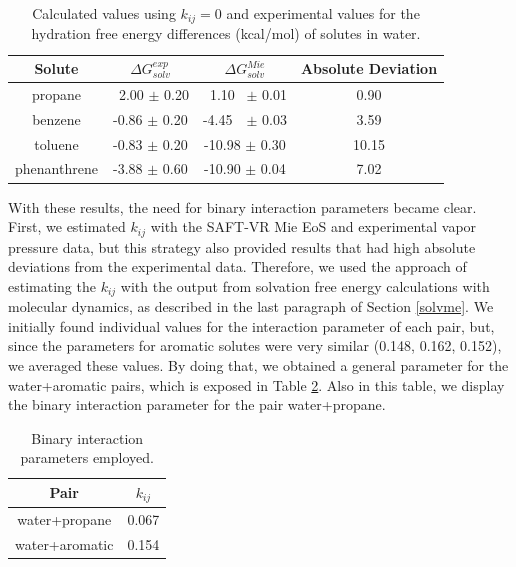 \begin{table}[h]
	\centering
	\caption{Calculated values using $k_{ij}=0$ and experimental values for the hydration free energy differences (kcal/mol) of solutes in water.}
	\label{tbl:solv3}
	\begin{tabular}{cccc}
		\hline\hline
		Solute       & $\Delta G_{solv}^{exp}$ & $\Delta G_{solv}^{Mie}$ & Absolute Deviation \\ \hline\hline
		propane      & $\,$ 2.00 $\pm$ 0.20         & $\,$ 1.10 $\,$ $\pm$ 0.01         & 0.90               \\
		benzene      & -0.86 $\pm$ 0.20        & -4.45 $\, \,$ $\pm$ 0.03        & 3.59               \\
		toluene      & -0.83 $\pm$ 0.20        & -10.98 $\pm$ 0.30       & 10.15              \\
		phenanthrene & -3.88 $\pm$ 0.60        & -10.90 $\pm$ 0.04       & 7.02               \\ \hline\hline
	\end{tabular}
\end{table}
\FloatBarrier

With these results, the need for binary interaction parameters became clear. First, we estimated $k_{ij}$ with the SAFT-VR Mie EoS and experimental vapor pressure data, but this strategy also provided results that had high absolute deviations from the experimental data. Therefore, we used the approach of estimating the $k_{ij}$ with the output from solvation free energy calculations with molecular dynamics, as described in the last paragraph of Section \ref{solvme}.  We initially found individual values for the interaction parameter of each pair, but, since the parameters for aromatic solutes were very similar (0.148, 0.162, 0.152), we averaged these values. By doing that,  we obtained a general parameter for the water+aromatic pairs, which is exposed in Table \ref{tbl:kij}. Also in this table, we display the binary interaction parameter for the pair water+propane. 

\begin{table}[h]
	\centering
	\caption{Binary interaction parameters employed.}
	\label{tbl:kij}
	\begin{tabular}{cc}
		\hline
		\hline
		Pair & $k_{ij}$ \\
		\hline\hline
		water+propane      & 0.067  \\
		water+aromatic      & 0.154 \\  
		\hline
		\hline
	\end{tabular}
\end{table}

